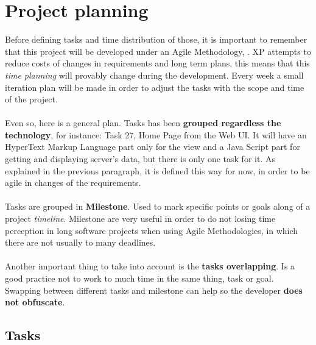 
\chapter{Project planning}

\label{chapter05}

Before defining tasks and time distribution of those, it is important to remember that this project will be developed under an Agile Methodology, . XP attempts to reduce costs of changes in requirements and long term plans, this means that this \textit{time planning} will provably change during the development. Every week a small iteration plan will be made in order to adjust the tasks with the scope and time of the project.
\\\\
Even so, here is a general plan. Tasks has been \textbf{grouped regardless the technology}, for instance\cite{w3_templates}: Task 27, Home Page from the Web UI. It will have an HyperText Markup Language part only for the view and a Java Script part for getting and displaying server's data, but there is only one task for it. As explained in the previous paragraph, it is defined this way for now, in order to be agile in changes of the requirements.
\\\\
Tasks are grouped in \textbf{Milestone}. Used to mark specific points or goals along of a project \textit{timeline}. Milestone are very useful in order to do not losing time perception in long software projects when using Agile Methodologies, in which there are not usually to many deadlines.
\\\\
Another important thing to take into account is the \textbf{tasks overlapping}. Is a good practice\cite{clean_coder} not to work to much time in the same thing, task or goal. Swapping between different tasks and milestone can help so the developer \textbf{does not obfuscate}.


\section{Tasks}

